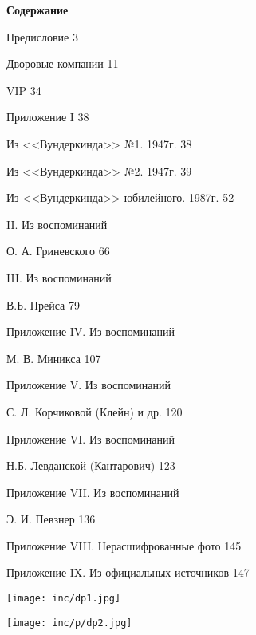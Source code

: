 \documentclass[utf8x, 12pt, twoside, a5paper]{G7-32} %
\begin{document}
\begin{center}

    \textbf{\Large Содержание}

    \indent

    Предисловие \hfill 3
    
    Дворовые компании \hfill 11
    
    VIP \hfill 34
    
    Приложение I \hfill 38
    
    \hspace{20pt} Из <<Вундеркинда>> №1. 1947г. \hfill 38
    
    \hspace{20pt} Из <<Вундеркинда>> №2. 1947г. \hfill 39
    
    \hspace{20pt} Из <<Вундеркинда>> юбилейного. 1987г. \hfill 52
    
    
    { II. Из воспоминаний 
    
    }
    
    \hspace{40pt}О. А. Гриневского \hfill 66
    
    { III. Из воспоминаний 
    
    }
    
    \hspace{40pt}В.Б. Прейса \hfill 79


    {\raggedright Приложение IV. Из воспоминаний
    
    } 
    \hspace{40pt}М. В. Миникса \hfill 107
   
    {\raggedright Приложение V. Из воспоминаний 
    
    }
    
    \hspace{40pt}С. Л. Корчиковой (Клейн) и др. \hfill 120
    
    {\raggedright Приложение VI. Из воспоминаний
    
    }
    
    \hspace{40pt}Н.Б. Левданской (Кантарович) \hfill 123

    {\raggedright  Приложение VII. Из воспоминаний
    
    }
    
    \hspace{40pt} Э. И. Певзнер \hfill 136
    
    Приложение VIII. Нерасшифрованные фото \hfill 145    
    
    Приложение IX. Из официальных источников \hfill 147
    
    
    
\end{center}

\noindent
\texttt{[image: inc/dp1.jpg]}

\newpage

\noindent
\texttt{[image: inc/p/dp2.jpg]}

\newpage
\end{document}
